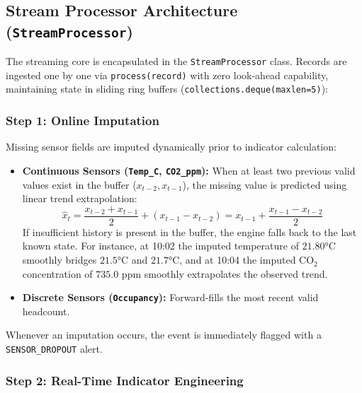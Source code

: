 \documentclass[12pt,a4paper]{article}
\begin{document}
\subsection{Stream Processor Architecture (\texttt{StreamProcessor})}

The streaming core is encapsulated in the \texttt{StreamProcessor} class. Records are ingested one by one via \texttt{process(record)} with zero look-ahead capability, maintaining state in sliding ring buffers (\texttt{collections.deque(maxlen=5)}):

\subsubsection{Step 1: Online Imputation}

Missing sensor fields are imputed dynamically prior to indicator calculation:
\begin{itemize}
  \item \textbf{Continuous Sensors (\texttt{Temp\_C}, \texttt{CO2\_ppm}):} When at least two previous valid values exist in the buffer ($x_{t-2}, x_{t-1}$), the missing value is predicted using linear trend extrapolation:
  \begin{equation}
    \hat{x}_t = \frac{x_{t-2} + x_{t-1}}{2} + (x_{t-1} - x_{t-2}) = x_{t-1} + \frac{x_{t-1} - x_{t-2}}{2}
  \end{equation}
  If insufficient history is present in the buffer, the engine falls back to the last known state. For instance, at 10:02 the imputed temperature of $21.80$°C smoothly bridges $21.5$°C and $21.7$°C, and at 10:04 the imputed $\text{CO}_2$ concentration of $735.0$ ppm smoothly extrapolates the observed trend.
  \item \textbf{Discrete Sensors (\texttt{Occupancy}):} Forward-fills the most recent valid headcount.
\end{itemize}
Whenever an imputation occurs, the event is immediately flagged with a \texttt{SENSOR\_DROPOUT} alert.

\subsubsection{Step 2: Real-Time Indicator Engineering}
\end{document}
